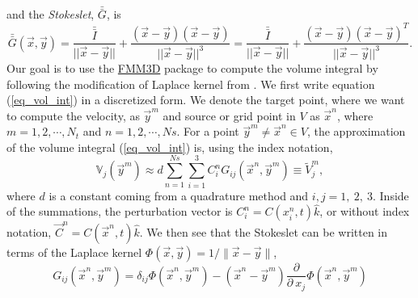 and the {\it{Stokeslet}}, $ \bar{\bar{G}}$, is
\begin{equation}
    \bar{\bar{G}}(\vec{x},\vec{y}) =   
    \frac{\bar{\bar{I}}}{||\vec{x}-\vec{y}||} + \frac{(\vec{x}-\vec{y})(\vec{x}-\vec{y})}{||\vec{x}-\vec{y} ||^3}
	 =   
	    \frac{\bar{\bar{I}}}{||\vec{x}-\vec{y}||} + \frac{(\vec{x}-\vec{y})(\vec{x}-\vec{y})^T}{||\vec{x}-\vec{y}||^3}.
\end{equation}
Our goal is to use the \href{https://github.com/flatironinstitute/FMM3D}{FMM3D} package to compute the volume integral by following the modification of Laplace kernel from \cite{tornberg_fast_2008}.
We first write equation (\ref{eq_vol_int}) in a discretized form. We denote the target point, where we want to compute the velocity, as $\vec{y}^m$ and source or grid point in $V$ as $\vec{x}^n$, where $m = 1,2, \cdots, N_t$ and $n = 1,2, \cdots, Ns$.
For a point $\vec{y}^m \neq \vec{x}^n \in V$, the approximation of the volume integral (\ref{eq_vol_int}) is, using the index notation, 
\begin{equation}
	\mathbb{V}_{j}(\vec{y}^m) 
	\approx d\sum_{n = 1}^{Ns} \sum_{i = 1}^{3}
	C^n_{i} G_{ij}(\vec{x}^n,\vec{y}^m)
	\equiv \tilde{V}_j^m,
	\label{eq_Vn}
\end{equation}
where $d$ is a constant coming from a quadrature method and $i,j = 1,\ 2,\ 3.$ 
Inside of the summations, the perturbation vector is 
 $C_i^n = C(x^n_i,  t)\hat{k}$, or without index notation, $ \vec{C}^n= C(\vec{x}^n, t) \hat{k}$. 
We then see that the Stokeslet can be written in terms of the Laplace kernel $\Phi(\vec{x},\vec{y}) = 1/{\| \vec{x} - \vec{y} \|}$,
\begin{equation}
	G_{ij}(\vec{x}^n,\vec{y}^m)
	 =  \delta_{ij} \Phi(\vec{x}^n, \vec{y}^m)
	 - (\vec{x}^n - \vec{y}^m)
	 \frac{\partial}{\partial \ x_j}
	\Phi(\vec{x}^n, \vec{y}^m)
	\label{eq_Gij}
\end{equation}
